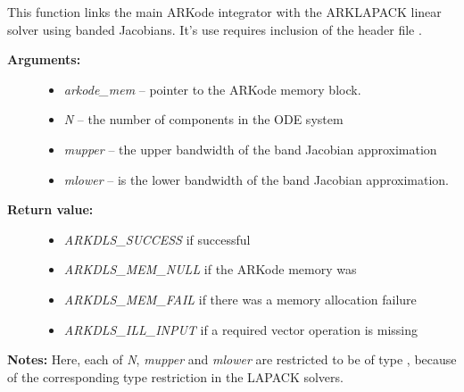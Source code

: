 \documentclass[letterpaper,10pt,english]{sphinxmanual}
\begin{document}

\begin{fulllineitems}
\label{c_interface/User_callable:ARKLapackBand}
This function links the main ARKode integrator with the ARKLAPACK
linear solver using banded Jacobians.  It's use requires inclusion
of the header file .
\begin{description}
\item[{\textbf{Arguments:}}] \leavevmode\begin{itemize}
\item {} 
\emph{arkode\_mem} -- pointer to the ARKode memory block.

\item {} 
\emph{N} -- the number of components in the ODE system

\item {} 
\emph{mupper} -- the upper bandwidth of the band Jacobian approximation

\item {} 
\emph{mlower} -- is the lower bandwidth of the band Jacobian approximation.

\end{itemize}

\item[{\textbf{Return value:}}] \leavevmode\begin{itemize}
\item {} 
\emph{ARKDLS\_SUCCESS}   if successful

\item {} 
\emph{ARKDLS\_MEM\_NULL}  if the ARKode memory was 

\item {} 
\emph{ARKDLS\_MEM\_FAIL}  if there was a memory allocation failure

\item {} 
\emph{ARKDLS\_ILL\_INPUT} if a required vector operation is missing

\end{itemize}

\end{description}

\textbf{Notes:} Here, each of \emph{N}, \emph{mupper} and \emph{mlower} are restricted
to be of type , because of the corresponding type restriction
in the LAPACK solvers.

\end{fulllineitems}
\end{document}
